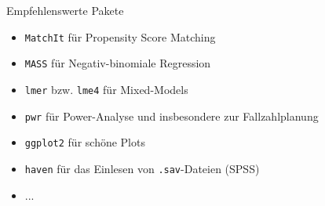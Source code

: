 \documentclass[xcolor=dvipsnames, aspectratio = 169]{beamer}
\begin{document}
\begin{frame}[fragile]{Empfehlenswerte Pakete}
	\begin{itemize}
		\item \verb+MatchIt+ für Propensity Score Matching 
	          \item \verb+MASS+ für Negativ-binomiale Regression \\
	          \item \verb+lmer+ bzw. \verb+lme4+ für Mixed-Models \\
	          \item \verb+pwr+ für Power-Analyse und insbesondere zur Fallzahlplanung \\
	          \item \verb+ggplot2+ für schöne Plots \\
	          \item \verb+haven+ für das Einlesen von \verb+.sav+-Dateien (SPSS) \\ 
	          \item ...
	\end{itemize}
\end{frame}
	
\end{document}
